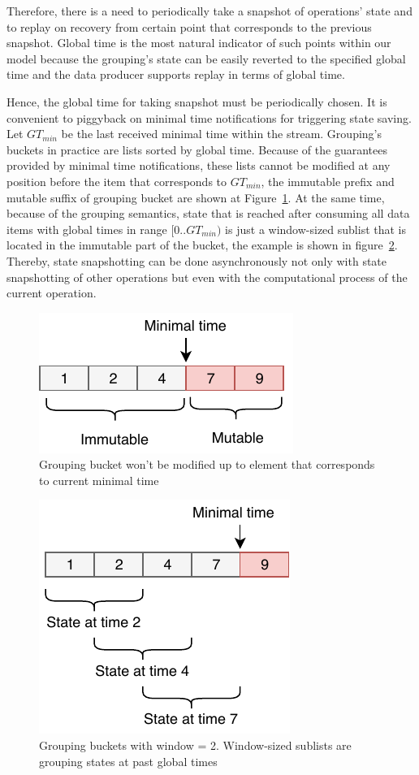 Therefore, there is a need to periodically take a snapshot of operations' state and to replay on recovery from certain point that corresponds to the previous snapshot. Global time is the most natural indicator of such points within our model because the grouping's state can be easily reverted to the specified global time and the data producer supports replay in terms of global time.   

Hence, the global time for taking snapshot must be periodically chosen. It is convenient to piggyback on minimal time notifications for triggering state saving. Let $GT_{min}$ be the last received minimal time within the stream. Grouping's buckets in practice are lists sorted by global time. Because of the guarantees provided by minimal time notifications, these lists cannot be modified at any position before the item that corresponds to $GT_{min}$, the immutable prefix and mutable suffix of grouping bucket are shown at Figure~\ref{immutable}. At the same time, because of the grouping semantics, state that is reached after consuming all data items with global times in range $[0..GT_{min})$ is just a window-sized sublist that is located in the immutable part of the bucket, the example is shown in figure~\ref{substate}. Thereby, state snapshotting can be done asynchronously not only with state snapshotting of other operations but even with the computational process of the current operation. 

\begin{figure}[htbp]
  \centering
  \includegraphics[width=.3\textwidth]{pics/immutable}
  \caption{Grouping bucket won't be modified up to element that corresponds to current minimal time}
  \label {immutable}
\end{figure}

\begin{figure}[htbp]
  \centering
  \includegraphics[width=.3\textwidth]{pics/substate}
  \caption{Grouping buckets with window = 2. Window-sized sublists are grouping states at past global times}
  \label {substate}
\end{figure}

